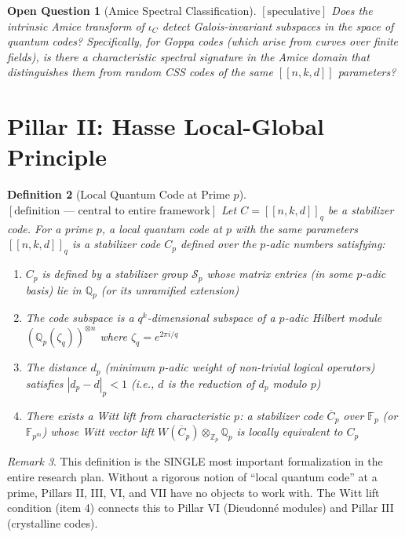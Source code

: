 \documentclass[12pt]{article}
\newtheorem{definition}{Definition}[section]
\newtheorem{question}[definition]{Open Question}
\theoremstyle{remark}
\newtheorem{remark}[definition]{Remark}
\begin{document}
\begin{question}[Amice Spectral Classification]
$[\text{speculative}]$
Does the intrinsic Amice transform of $\iota_C$ detect Galois-invariant
subspaces in the space of quantum codes? Specifically, for Goppa codes
(which arise from curves over finite fields), is there a characteristic
spectral signature in the Amice domain that distinguishes them from
random CSS codes of the same $[[n,k,d]]$ parameters?
\end{question}

\section{Pillar II: Hasse Local-Global Principle}

\begin{definition}[Local Quantum Code at Prime $p$]
$[\text{definition — central to entire framework}]$
Let $C = [[n,k,d]]_q$ be a stabilizer code. For a prime $p$, a
\emph{local quantum code at $p$} with the same parameters $[[n,k,d]]_q$
is a stabilizer code $C_p$ defined over the $p$-adic numbers satisfying:
\begin{enumerate}
\item $C_p$ is defined by a stabilizer group $\mathcal{S}_p$ whose matrix
  entries (in some $p$-adic basis) lie in $\mathbb{Q}_p$ (or its
  unramified extension)
\item The code subspace is a $q^k$-dimensional subspace of a $p$-adic
  Hilbert module $(\mathbb{Q}_p(\zeta_q))^{\otimes n}$ where
  $\zeta_q = e^{2\pi i/q}$
\item The distance $d_p$ (minimum $p$-adic weight of non-trivial logical
  operators) satisfies $|d_p - d|_p < 1$ (i.e., $d$ is the reduction of
  $d_p$ modulo $p$)
\item There exists a \emph{Witt lift} from characteristic $p$: a stabilizer
  code $\overline{C}_p$ over $\mathbb{F}_p$ (or $\mathbb{F}_{p^m}$) whose
  Witt vector lift $W(\overline{C}_p) \otimes_{\mathbb{Z}_p} \mathbb{Q}_p$
  is locally equivalent to $C_p$
\end{enumerate}
\end{definition}

\begin{remark}
This definition is the SINGLE most important formalization in the
entire research plan. Without a rigorous notion of ``local quantum code''
at a prime, Pillars II, III, VI, and VII have no objects to work with.
The Witt lift condition (item 4) connects this to Pillar VI (Dieudonn\'e
modules) and Pillar III (crystalline codes).
\end{remark}
\end{document}
